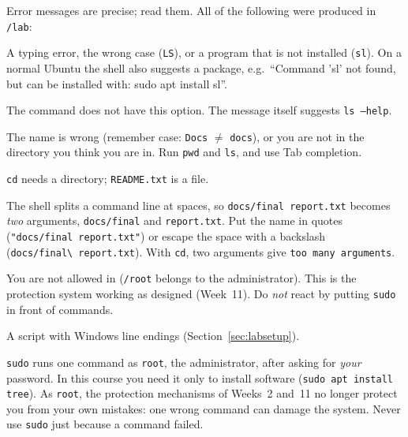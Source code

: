 \documentclass[11pt,a4paper]{article}
\newcommand{\cmd}[1]{\texttt{#1}}
\begin{document}
Error messages are precise; read them. All of the following were produced in \texttt{\tl/lab}:


\begin{description}[leftmargin=0pt,itemsep=0.25em]
  \item[\texttt{command not found}] A typing error, the wrong case (\cmd{LS}), or a program that is not installed (\cmd{sl}). On a normal Ubuntu the shell also suggests a package, e.g.\ ``Command 'sl' not found, but can be installed with: sudo apt install sl''.
  \item[\texttt{invalid option}] The command does not have this option. The message itself suggests \cmd{ls --help}.
  \item[\texttt{No such file or directory}] The name is wrong (remember case: \texttt{Docs} $\neq$ \texttt{docs}), or you are not in the directory you think you are in. Run \cmd{pwd} and \cmd{ls}, and use Tab completion.
  \item[\texttt{Not a directory}] \cmd{cd} needs a directory; \texttt{README.txt} is a file.
  \item[Two errors for one name] The shell splits a command line at spaces, so \texttt{docs/final report.txt} becomes \emph{two} arguments, \texttt{docs/final} and \texttt{report.txt}. Put the name in quotes (\texttt{"docs/final report.txt"}) or escape the space with a backslash (\texttt{docs/final\textbackslash\ report.txt}). With \cmd{cd}, two arguments give \texttt{too many arguments}.
  \item[\texttt{Permission denied}] You are not allowed in (\texttt{/root} belongs to the administrator). This is the protection system working as designed (Week~11). Do \emph{not} react by putting \cmd{sudo} in front of commands.
  \item[\texttt{\$'\textbackslash r': command not found}] A script with Windows line endings (Section~\ref{sec:labsetup}).
\end{description}

\begin{tryit}
\cmd{sudo} runs one command as \texttt{root}, the administrator, after asking for \emph{your} password. In this course you need it only to install software (\cmd{sudo apt install tree}). As \texttt{root}, the protection mechanisms of Weeks~2 and~11 no longer protect you from your own mistakes: one wrong command can damage the system. Never use \cmd{sudo} just because a command failed.
\end{tryit}
\end{document}
